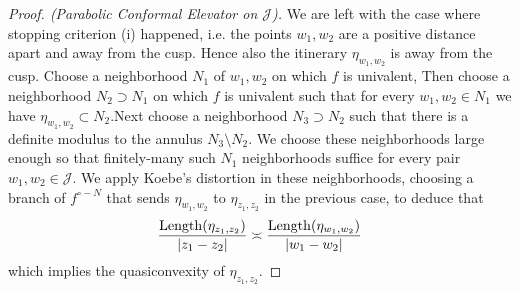 \begin{proof}[Proof. (Parabolic Conformal Elevator on $\mathcal J$)]
 We are left with the case where stopping criterion (i) happened, i.e. the points $w_1,w_2$ are a positive distance apart and away from the cusp. Hence also the itinerary $\eta_{w_1,w_2}$ is away from the cusp. Choose a neighborhood $N_1$ of $w_1,w_2$  on which $f$ is univalent, Then choose a neighborhood $N_2 \supset N_1$ on which $f$ is univalent such that for every $w_1,w_2 \in N_1$ we have $\eta_{w_1,w_2} \subset N_2$.Next choose a neighborhood $N_3 \supset N_2$ such that there is a definite modulus to the annulus $N_3 \setminus N_2$. We choose these neighborhoods large enough so that finitely-many such $N_1$ neighborhoods suffice for every pair $w_1,w_2 \in \mathcal J$. We apply Koebe's distortion in these neighborhoods, choosing a branch of $f^{\circ -N}$ that sends $\eta_{w_1,w_2}$ to $\eta_{z_1,z_2}$ in the previous case, to deduce that 
\begin{equation}
\frac{\operatorname{Length}(\eta_{z_1,z_2})}{|z_1-z_2|} \asymp \frac{\operatorname{Length}(\eta_{w_1,w_2})}{|w_1-w_2|}
\end{equation}
which implies the quasiconvexity of $\eta_{z_1,z_2}$.

%
%
\end{proof}


